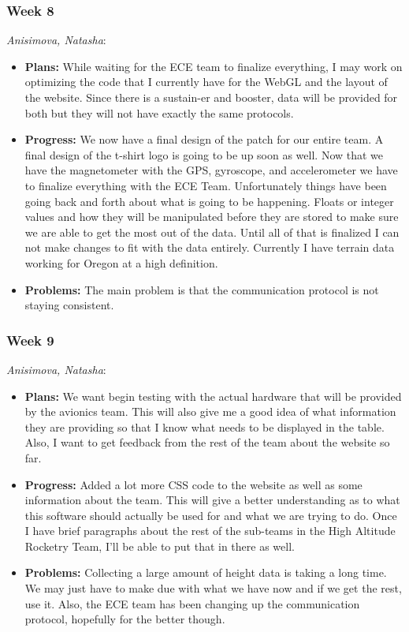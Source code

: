 \documentclass[10pt,draftclsnofoot,onecolumn]{IEEEtran}
\newcommand{\subsubsubsection}[1]{
	\hfill\break\textit{#1}:
}
\begin{document}
\subsubsection{Week 8}
\subsubsubsection{Anisimova, Natasha}
\begin{itemize}
	\item \textbf{Plans: }
	While waiting for the ECE team to finalize everything, I may work on optimizing the code that I currently have for the WebGL and the layout of the website. Since there is a sustain-er and booster, data will be provided for both but they will not have exactly the same protocols.
	\item \textbf{Progress: }
	We now have a final design of the patch for our entire team. A final design of the t-shirt logo is going to be up soon as well. Now that we have the magnetometer with the GPS, gyroscope, and accelerometer we have to finalize everything with the ECE Team. Unfortunately things have been going back and forth about what is going to be happening. Floats or integer values and how they will be manipulated before they are stored to make sure we are able to get the most out of the data. Until all of that is finalized I can not make changes to fit with the data entirely. Currently I have terrain data working for Oregon at a high definition.

	\item \textbf{Problems: }
	The main problem is that the communication protocol is not staying consistent.
\end{itemize}
\subsubsection{Week 9}
\subsubsubsection{Anisimova, Natasha}
\begin{itemize}
	\item \textbf{Plans: }
	We want begin testing with the actual hardware that will be provided by the avionics team. This will also give me a good idea of what information they are providing so that I know what needs to be displayed in the table. Also, I want to get feedback from the rest of the team about the website so far.
	\item \textbf{Progress: }
	Added a lot more CSS code to the website as well as some information about the team. This will give a better understanding as to what this software should actually be used for and what we are trying to do. Once I have brief paragraphs about the rest of the sub-teams in the High Altitude Rocketry Team, I'll be able to put that in there as well.

	\item \textbf{Problems: }
	Collecting a large amount of height data is taking a long time. We may just have to make due with what we have now and if we get the rest, use it. Also, the ECE team has been changing up the communication protocol, hopefully for the better though.
\end{itemize}
\end{document}
